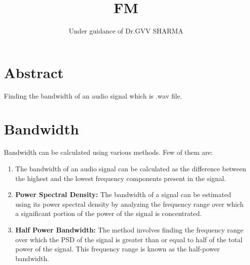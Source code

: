 \documentclass[journal,12pt,twocolumn]{article}
\title{FM}
\author{Under guidance of Dr.GVV SHARMA}
\begin{document}
\maketitle
\tableofcontents

\section{Abstract}
Finding the bandwidth of an audio signal which is .wav file.

\section{Bandwidth}
Bandwidth can be calculated using various methods. Few of them are: 
\begin{enumerate}
\item The bandwidth of an audio signal can be calculated as the difference between the highest and the lowest frequency components present in the signal.

\item \textbf{Power Spectral Density:}
The bandwidth of a signal can be estimated using its power spectral density by analyzing the frequency range over which a significant portion of the power of the signal is concentrated.

\item \textbf{Half Power Bandwidth:}
The method involves finding the frequency range over which the PSD of the signal is greater than or equal to half of the total power of the signal. This frequency range is known as the half-power bandwidth.

\end{enumerate}
\end{document}
